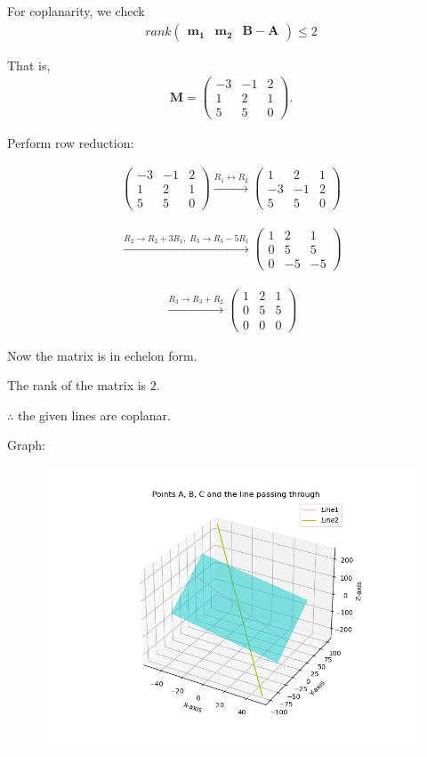 \documentclass{beamer}
\theoremstyle{remark}
\newcommand{\myvec}[1]{\ensuremath{\begin{pmatrix}#1\end{pmatrix}}}
\let\vec\mathbf
\numberwithin{equation}{section}
\begin{document}
For coplanarity, we check
\begin{align}
rank \myvec{ \vec{m_1} & \vec{m_2} & \vec{B}-\vec{A} } \leq 2
\end{align}

That is,
\begin{align}
	\vec{M} = \myvec{ 
-3 & -1 & 2 \\
1 & 2 & 1 \\
5 & 5 & 0 
}.
\end{align}

Perform row reduction:

\begin{align}
\myvec{
-3 & -1 & 2 \\
1 & 2 & 1 \\
5 & 5 & 0
}
\xrightarrow[]{R_1 \leftrightarrow R_2}
\myvec{
1 & 2 & 1 \\
-3 & -1 & 2 \\
5 & 5 & 0
}
\end{align}

\begin{align}
\xrightarrow[]{R_2 \to R_2 + 3R_1,\; R_3 \to R_3 - 5R_1}
\myvec{
1 & 2 & 1 \\
0 & 5 & 5 \\
0 & -5 & -5
}
\end{align}

\begin{align}
\xrightarrow[]{R_3 \to R_3 + R_2}
\myvec{
1 & 2 & 1 \\
0 & 5 & 5 \\
0 & 0 & 0
}
\end{align}

Now the matrix is in echelon form.  

The rank of the matrix is \(2\).

$\therefore$ the given lines are coplanar.
		

Graph:
\begin{figure}[H]
    \centering
    \includegraphics[scale=0.5]{plot}
    \caption{}
    \label{fig:plot}
\end{figure}
\end{document}
